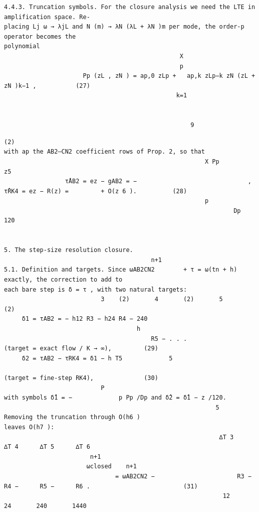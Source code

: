 \documentclass[letterpaper]{article}
\begin{document}
\begin{Verbatim}[fontsize=\fontsize{6.35}{7.15}\selectfont,breaklines=false]
4.4.3. Truncation symbols. For the closure analysis we need the LTE in amplification space. Re-
placing Lj ω → λjL and N (m) → λN (λL + λN )m per mode, the order-p operator becomes the
polynomial
                                                 X
                                                 p
                      Pp (zL , zN ) = ap,0 zLp +   ap,k zLp−k zN (zL + zN )k−1 ,           (27)
                                                k=1


                                                    9
\end{Verbatim}
\newpage
\begin{Verbatim}[fontsize=\fontsize{6.35}{7.15}\selectfont,breaklines=false]
        (2)
with ap the AB2–CN2 coefficient rows of Prop. 2, so that
                                                        X Pp                                          z5
                 τ̂AB2 = ez − gAB2 = −                               ,       τ̂RK4 = ez − R(z) =         + O(z 6 ).          (28)
                                                        p
                                                                Dp                                   120


5. The step-size resolution closure.
                                         n+1
5.1. Definition and targets. Since ωAB2CN2        + τ = ω(tn + h) exactly, the correction to add to
each bare step is δ = τ , with two natural targets:
                           3    (2)       4       (2)       5       (2)
     δ1 = τAB2 = − h12 R3 − h24 R4 − 240
                                     h
                                         R5 − . . .                                    (target = exact flow / K → ∞),         (29)
     δ2 = τAB2 − τRK4 = δ1 − h T5             5
                                                                                       (target = fine-step RK4),              (30)
                           P
with symbols δ̂1 = −             p Pp /Dp and δ̂2 = δ̂1 − z /120.
                                                           5                           Removing the truncation through O(h6 )
leaves O(h7 ):
                                                            ∆T 3      ∆T 4      ∆T 5      ∆T 6
                        n+1
                       ωclosed    n+1
                               = ωAB2CN2 −                       R3 −      R4 −      R5 −      R6 .                          (31)
                                                             12        24       240       1440


\end{Verbatim}
\end{document}
